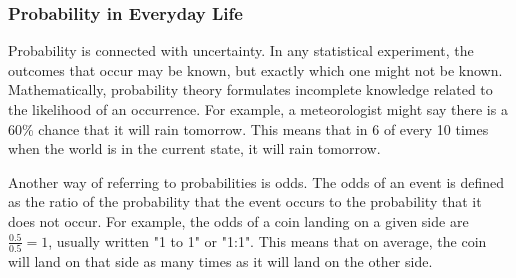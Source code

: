             \subsubsection{ Probability in Everyday Life}
            \nopagebreak
      \label{m39377*id111785}Probability is connected with uncertainty. In any
statistical experiment, the outcomes that occur may be known, but exactly which
one might not be known. Mathematically, probability theory formulates incomplete
knowledge related to the likelihood of an occurrence. For example, a
meteorologist might say there is a 60\% chance that it will rain tomorrow. This
means that in 6 of every 10 times when the world is in the current state, it
will rain tomorrow.\par 
      \label{m39377*id111800}Another way of referring to probabilities is odds. The
odds of an event is defined as the ratio of the probability that the event
occurs to the probability that it does not occur. For example, the odds of a
coin landing on a given side are $\frac{0.5}{0.5}=1$, usually written "1 to 1"
or "1:1". This means that on average, the coin will land on that side as many
times as it will land on the other side.\par 
      \label{m39377*uid36}
